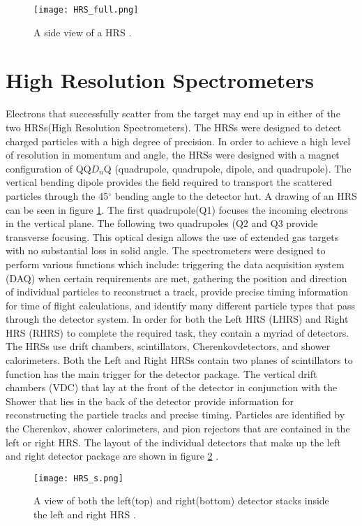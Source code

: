 \begin{figure}[t]
	\centering
	\texttt{[image: HRS\_full.png]}
	\caption{A side view of a HRS \cite{HallA}.
		\label{hrsfull}}
\end{figure}

\section{High Resolution Spectrometers}\label{sec:HRS}
Electrons that successfully scatter from the target may end up in either of the two HRSs(High Resolution Spectrometers). The HRSs were designed to detect charged particles with a high degree of precision. 
In order to achieve a high level of resolution in momentum and angle, the HRSs were designed with a magnet configuration of QQ$D_n$Q (quadrupole, quadrupole, dipole, and quadrupole). The vertical bending dipole provides the field required to transport the scattered particles through the 45$^\circ$ bending angle to the detector hut. A drawing of an HRS can be seen in figure \ref{hrsfull}. The first quadrupole(Q1) focuses the incoming electrons in the vertical plane. The following two quadrupoles (Q2 and Q3 provide transverse focusing. This optical design allows the use of extended gas targets with no substantial loss in solid angle\cite{HallA}.  The spectrometers were designed to perform various functions which include: triggering the data acquisition system (DAQ) when certain requirements are met, gathering the position and direction of individual particles to reconstruct a track, provide precise timing information for time of flight calculations, and identify many different particle types that pass through the detector system. In order for both the Left HRS (LHRS) and Right HRS (RHRS) to  complete the required task, they contain a myriad of detectors. The HRSs use drift chambers, scintillators, Cherenkovdetectors, and shower calorimeters. Both the Left and Right HRSs contain two planes of scintillators to function has the main trigger for the detector package. The vertical drift chambers (VDC) that lay at the front of the detector in conjunction with the Shower that lies in the back of the detector provide information for reconstructing the particle tracks and precise timing. Particles are identified by the Cherenkov, shower calorimeters, and pion rejectors that are contained in the left or right HRS. The layout of the individual detectors that make up the left and right detector package are shown in figure \ref{hrsss}  \cite{HallA}.
\begin{figure}[t]
	\centering
	\texttt{[image: HRS\_s.png]}
	\caption{A view of both the left(top) and right(bottom) detector stacks inside the left and right HRS \cite{HallA}.
	\label{hrsss}}
\end{figure}

